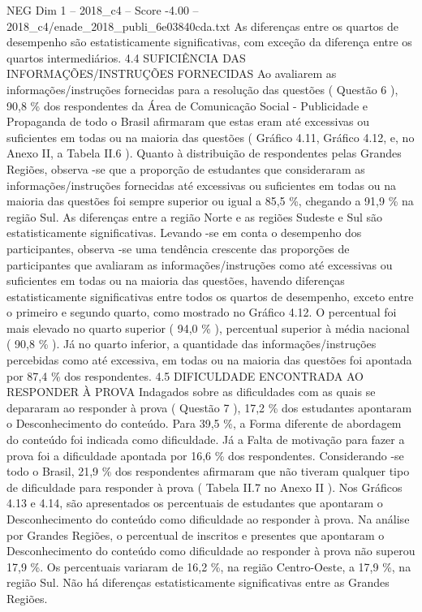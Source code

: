 \begin{textsample}{NEG Dim 1 – 2018\_c4 – Score -4.00 – 2018\_c4/enade\_2018\_publi\_6e03840cda.txt}
As diferenças entre os quartos de desempenho são estatisticamente significativas, com exceção da diferença entre os quartos intermediários. 4.4 SUFICIÊNCIA DAS INFORMAÇÕES/INSTRUÇÕES FORNECIDAS Ao avaliarem as informações/instruções fornecidas para a resolução das questões ( Questão 6 ), 90,8 \% dos respondentes da Área de Comunicação Social - Publicidade e Propaganda de todo o Brasil afirmaram que estas eram até excessivas ou suficientes em todas ou na maioria das questões ( Gráfico 4.11, Gráfico 4.12, e, no Anexo II, a Tabela II.6 ).
Quanto à distribuição de respondentes pelas Grandes Regiões, observa -se que a proporção de estudantes que consideraram as informações/instruções fornecidas até excessivas ou suficientes em todas ou na maioria das questões foi sempre superior ou igual a 85,5 \%, chegando a 91,9 \% na região Sul.
As diferenças entre a região Norte e as regiões Sudeste e Sul são estatisticamente significativas.
Levando -se em conta o desempenho dos participantes, observa -se uma tendência crescente das proporções de participantes que avaliaram as informações/instruções como até excessivas ou suficientes em todas ou na maioria das questões, havendo diferenças estatisticamente significativas entre todos os quartos de desempenho, exceto entre o primeiro e segundo quarto, como mostrado no Gráfico 4.12.
O percentual foi mais elevado no quarto superior ( 94,0 \% ), percentual superior à média nacional ( 90,8 \% ).
Já no quarto inferior, a quantidade das informações/instruções percebidas como até excessiva, em todas ou na maioria das questões foi apontada por 87,4 \% dos respondentes. 4.5 DIFICULDADE ENCONTRADA AO RESPONDER À PROVA Indagados sobre as dificuldades com as quais se depararam ao responder à prova ( Questão 7 ), 17,2 \% dos estudantes apontaram o Desconhecimento do conteúdo.
Para 39,5 \%, a Forma diferente de abordagem do conteúdo foi indicada como dificuldade.
Já a Falta de motivação para fazer a prova foi a dificuldade apontada por 16,6 \% dos respondentes.
Considerando -se todo o Brasil, 21,9 \% dos respondentes afirmaram que não tiveram qualquer tipo de dificuldade para responder à prova ( Tabela II.7 no Anexo II ).
Nos Gráficos 4.13 e 4.14, são apresentados os percentuais de estudantes que apontaram o Desconhecimento do conteúdo como dificuldade ao responder à prova.
Na análise por Grandes Regiões, o percentual de inscritos e presentes que apontaram o Desconhecimento do conteúdo como dificuldade ao responder à prova não superou 17,9 \%.
Os percentuais variaram de 16,2 \%, na região Centro-Oeste, a 17,9 \%, na região Sul.
Não há diferenças estatisticamente significativas entre as Grandes Regiões.

\end{textsample}
